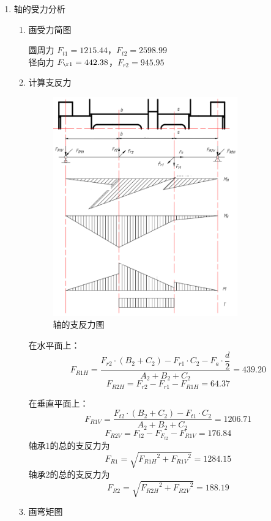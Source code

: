 \begin{enumerate}[A]
	\item 轴的受力分析
	\begin{enumerate}[a]
		\item 画受力简图
		\par 圆周力 $F_{t1}=1215.44$，$F_{t2}=2598.99$ \\
		径向力 $F_{\r1}=442.38$，$F_{r2}=945.95$
		\item 计算支反力 
		\begin{figure}[H]
			\begin{center}
				\caption{轴\uppercase\expandafter{}的支反力图}
				\includegraphics[width=0.8\textwidth]{pic/jiaohe2.png}
			\end{center}
		\end{figure}
		\par 在水平面上：
		$$F_{R1H}=\dfrac{F_{r2}\cdot \left(B_2+C_2\right)-F_{r1}\cdot C_2-F_a\cdot \dfrac{d}{2}}{A_2+B_2+C_2}=439.20$$
		$$F_{R2H}=F_{r2}-F_{r1}-F_{R1H}=64.37$$
		\par 在垂直平面上：
		$$F_{R1V}=\dfrac{F_{t2}\cdot \left(B_2+C_2\right)-F_{t1}\cdot C_2}{A_2+B_2+C_2}=1206.71$$
		$$F_{R2V}=F_{t2}-F_F_{t2}-F_{R1V}=176.84$$
		轴承1的总的支反力为
		$$F_{R1}=\sqrt{{F_{R1H}}^2+{F_{R1V}}^2}=1284.15$$
		轴承2的总的支反力为
		$$F_{R2}=\sqrt{{F_{R2H}}^2+{F_{R2V}}^2}=188.19$$
		\item 画弯矩图

\end{enumerate}
\end{enumerate}
